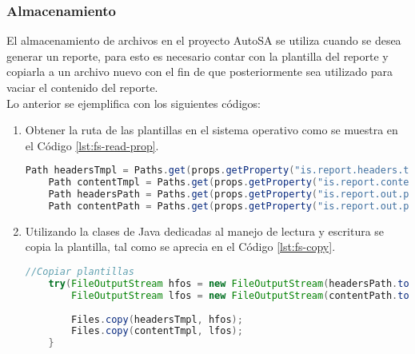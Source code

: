 \subsubsection{Almacenamiento}
El almacenamiento de archivos en el proyecto AutoSA se utiliza cuando se desea generar un reporte, para esto es necesario contar con la plantilla del reporte y copiarla a un archivo nuevo con el fin de que posteriormente sea utilizado para vaciar el contenido del reporte.\\
Lo anterior se ejemplifica con los siguientes códigos:
\begin{enumerate}
	\item Obtener la ruta de las plantillas en el sistema operativo como se muestra en el Código \ref{lst:fs-read-prop}.
	\begin{lstlisting}[language=Java, caption={Obtención de las rutas de las plantillas.}, captionpos=b, label={lst:fs-read-prop}]
	Path headersTmpl = Paths.get(props.getProperty("is.report.headers.tmpl"));
	Path contentTmpl = Paths.get(props.getProperty("is.report.content.tmpl"));
	Path headersPath = Paths.get(props.getProperty("is.report.out.path"), headersTmpl.getFileName().toString());
	Path contentPath = Paths.get(props.getProperty("is.report.out.path"), contentTmpl.getFileName().toString());
	\end{lstlisting}

	\item Utilizando la clases de Java dedicadas al manejo de lectura y escritura se copia la plantilla, tal como se aprecia en el Código \ref{lst:fs-copy}.
	\begin{lstlisting}[language=Java, caption={Copia de archivos.}, captionpos=b, label={lst:fs-copy}]
	//Copiar plantillas
	try(FileOutputStream hfos = new FileOutputStream(headersPath.toFile(), false);
		FileOutputStream lfos = new FileOutputStream(contentPath.toFile(), false)){
		
		Files.copy(headersTmpl, hfos);
		Files.copy(contentTmpl, lfos);
	}
	\end{lstlisting}
\end{enumerate}
